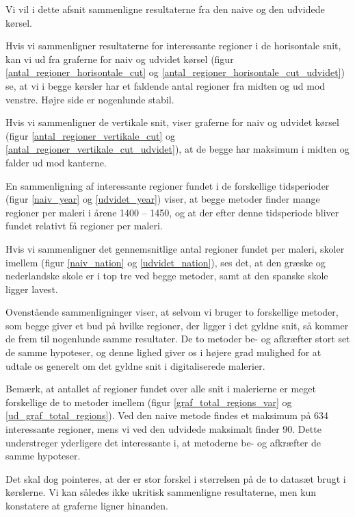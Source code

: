 {
Vi vil i dette afsnit sammenligne resultaterne fra den naive og den
udvidede kørsel.

Hvis vi sammenligner resultaterne for interessante regioner i de
horisontale snit, kan vi ud fra graferne for naiv og udvidet kørsel
(figur \ref{antal_regioner_horisontale_cut} og
\ref{antal_regioner_horisontale_cut_udvidet}) se, at vi i begge kørsler har
et faldende antal regioner fra midten og ud mod venstre. Højre side er
nogenlunde stabil.

Hvis vi sammenligner de vertikale snit, viser graferne for naiv og
udvidet kørsel (figur \ref{antal_regioner_vertikale_cut} og
\ref{antal_regioner_vertikale_cut_udvidet}), at de begge har maksimum i
midten og falder ud mod kanterne.

En sammenligning af interessante regioner fundet i de forskellige
tidsperioder (figur \ref{naiv_year} og \ref{udvidet_year}) viser, at
begge metoder finder mange regioner per maleri i årene 1400 -- 1450, og
at der efter denne tidsperiode bliver fundet relativt få regioner per
maleri.

Hvis vi sammenligner det gennemsnitlige antal regioner fundet per
maleri, skoler imellem (figur \ref{naiv_nation} og
\ref{udvidet_nation}), ses det, at den græske og nederlandske skole er i
top tre ved begge metoder, samt at den spanske skole ligger lavest.

Ovenstående sammenligninger viser, at selvom vi bruger to forskellige
metoder, som begge giver et bud på hvilke regioner, der ligger i det
gyldne snit, så kommer de frem til nogenlunde samme resultater. De to
metoder be- og afkræfter stort set de samme hypoteser, og denne lighed
giver os i højere grad mulighed for at udtale os generelt om det gyldne
snit i digitaliserede malerier.

Bemærk, at antallet af regioner fundet over alle snit i malerierne
er meget forskellige de to metoder imellem (figur
\ref{graf_total_regions_var} og \ref{ud_graf_total_regions}). Ved den
naive metode findes et maksimum på 634 interessante regioner, mens vi
ved den udvidede maksimalt finder 90.  Dette understreger yderligere det
interessante i, at metoderne be- og afkræfter de samme hypoteser.

Det skal dog pointeres, at der er stor forskel i størrelsen på de to
datasæt brugt i kørslerne. Vi kan således ikke ukritisk sammenligne
resultaterne, men kun konstatere at graferne ligner hinanden.

}
